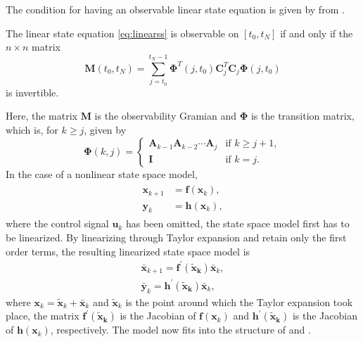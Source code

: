 The condition for having an observable linear state equation is given by  from \cite{Rugh:1996}.
%
\begin{theorem}
\label{th:observability}
	The linear state equation \eqref{eq:linearss} is observable on $[t_0, t_N]$ if and only if the $n \times n$ matrix
	\begin{equation}
	\label{eq:observabilitytheorem}
		\bm{M}(t_0,t_N) = \sum_{j=t_0}^{t_N-1} \bm{\Phi}^T(j,t_0)\bm{C}^T_j\bm{C}_j\bm{\Phi}(j,t_0)
	\end{equation}
	is invertible.
\end{theorem}
%
Here, the matrix $\bm{M}$ is the observability Gramian and $\bm{\Phi}$ is the transition matrix, which is, for $k \ge j$, given by
%
\begin{equation}
	\bm{\Phi}(k,j) =
		\begin{cases}
			\bm{A}_{k-1} \bm{A}_{k-2} \cdots \bm{A}_j & \text{if } k \ge j+1, \\
			\bm{I} & \text{if } k = j.
		\end{cases}
\end{equation}
%
In the case of a nonlinear state space model,
%
\begin{align}
\label{eq:nlss}
\begin{split}
	\bm{x}_{k+1} &= \bm{f}(\bm{x}_k), \\
	\bm{y}_k &= \bm{h}(\bm{x}_k),
\end{split}
\end{align}
%
where the control signal $\bm{u}_k$ has been omitted, the state space model first has to be linearized.
By linearizing through Taylor expansion and retain only the first order terms, the resulting linearized state space model is
%
\begin{equation}
\begin{split}
	\bar{\bm{x}}_{k+1} = \bm{f}^\prime(\bm{\tilde{\bm{x}}_k}) \bar{\bm{x}}_k, \\
	\bar{\bm{y}}_{k} = \bm{h}^\prime(\bm{\tilde{\bm{x}}_k}) \bar{\bm{x}}_k,
\end{split}
\end{equation}
%
where $\bm{x}_k = \tilde{\bm{x}}_k + \bar{\bm{x}}_k$ and $\tilde{\bm{x}}_k$ is the point around which the Taylor expansion took place, the matrix $\bm{f}^\prime(\bm{\tilde{\bm{x}}_k})$ is the Jacobian of $\bm{f}(\bm{x}_k)$ and $\bm{h}^\prime(\bm{\tilde{\bm{x}}_k})$ is the Jacobian of $\bm{h}(\bm{x}_k)$, respectively.
The model now fits into the structure of  and .
